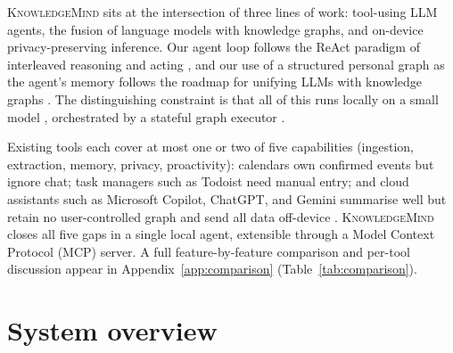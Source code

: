 \documentclass{ecai}
\newcommand{\km}{\textsc{KnowledgeMind}}
\begin{document}
\km{} sits at the intersection of three lines of work: tool-using LLM agents,
the fusion of language models with knowledge graphs, and on-device
privacy-preserving inference. Our agent loop follows the ReAct paradigm of
interleaved reasoning and acting \citep{yao2023react}, and our use of a
structured personal graph as the agent's memory follows the roadmap for unifying
LLMs with knowledge graphs \citep{pan2024kg}. The distinguishing constraint is
that all of this runs locally on a small model \citep{qwen2024}, orchestrated by
a stateful graph executor \citep{langgraph2024}.

Existing tools each cover at most one or two of five capabilities (ingestion,
extraction, memory, privacy, proactivity): calendars own confirmed events but
ignore chat; task managers such as Todoist need manual entry; and cloud
assistants such as Microsoft Copilot, ChatGPT, and Gemini summarise well but
retain no user-controlled graph and send all data off-device
\citep{ms2024copilot,openai2024gpt4,notion2024}. \km{} closes all five gaps in a
single local agent, extensible through a Model Context Protocol (MCP) server. A
full feature-by-feature comparison and per-tool discussion appear in
Appendix~\ref{app:comparison} (Table~\ref{tab:comparison}).


\section{System overview}
\end{document}
